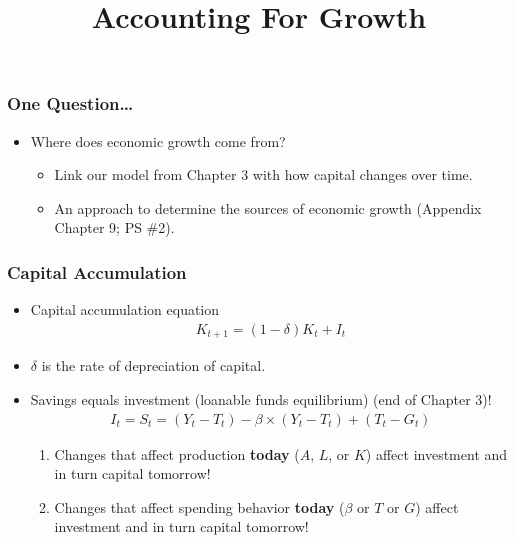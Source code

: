 \documentclass[handout]{beamer}
\title[NYU Stern] %
{\Large Accounting For Growth}
\author[Michael Waugh] %
{\bf{\Large}}%
\date[] %
\begin{document}
\begin{frame}
  \titlepage
\end{frame}



\begin{frame}[t]
\frametitle{One Question\ldots}
\bigskip
\begin{itemize}
\medskip
\item Where does economic growth come from?
\begin{itemize}
\medskip
\item Link our model from Chapter 3 with how capital changes over time.
\medskip
\item An approach to determine the sources of economic growth (Appendix Chapter 9; PS \#2).
\end{itemize}
\end{itemize}
\end{frame}



\begin{frame}[t]
\frametitle{Capital Accumulation}
\footnotesize
\begin{itemize}
\item Capital accumulation equation
\begin{eqnarray*}
K_{t+1} = (1 - \delta) K_{t} + I_t
\end{eqnarray*}
\medskip
\item $\delta$ is the rate of depreciation of capital.
\bigskip
\item Savings equals investment (loanable funds equilibrium) (end of Chapter 3)!
\begin{eqnarray*}
I_t = S_t = (Y_t - T_t) - \beta \times(Y_t- T_t) + (T_t - G_t)
\end{eqnarray*}
\begin{enumerate}
\footnotesize
\smallskip
\item Changes that affect production \textbf{today} ($A$, $L$, or $K$) affect investment and in turn capital tomorrow!
\medskip
\medskip
\item Changes that affect spending behavior \textbf{today} ($\beta$ or $T$ or $G$) affect investment and in turn capital tomorrow!
\end{enumerate}
\end{itemize}
\end{frame}
\end{document}
